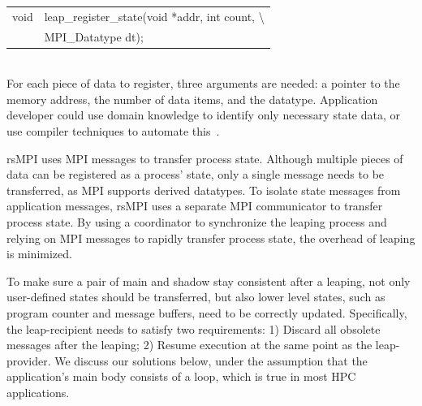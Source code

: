 \begin{tabular}{ l l}
void & leap\_register\_state(void *addr, int count, \textbackslash \\
& MPI\_Datatype dt);
\end{tabular} \\
For each piece of data to register, three arguments are needed: a pointer to the memory address, the number of data items, and the datatype. 
Application developer could use domain knowledge to identify only necessary state data, or use compiler techniques to automate this~\cite{5160999}. 


rsMPI uses MPI messages to transfer process state. Although multiple pieces of data can be registered as a process' state, only a single message needs to be transferred, as MPI supports derived datatypes. To isolate state messages from application messages, rsMPI uses a separate MPI communicator to transfer process state.  
By using a coordinator to synchronize the leaping process and relying on  MPI messages to rapidly transfer process state, the overhead of leaping is minimized. 

To make sure a pair of main and shadow stay consistent after a leaping, not only user-defined states should be transferred, but also lower level states, such as program counter and message buffers, need to be correctly updated. Specifically, the leap-recipient needs to satisfy two requirements:  
1) Discard all obsolete messages after the leaping; 2) Resume execution at the same point as the leap-provider. We discuss our solutions below, under the assumption that the application's main body consists of a loop, which is true in most HPC applications. 

